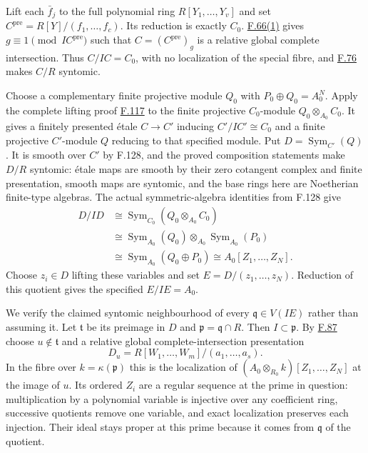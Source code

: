 \documentclass[11pt,a4paper,openany]{report}
\begin{document}
Lift each \(\bar f_j\) to the full polynomial ring \(R[Y_1,\ldots,Y_v]\) and set \(C^{\mathrm{pre}}=R[Y]/(f_1,\ldots,f_c)\). Its reduction is exactly \(C_0\). \hyperref[AG-RG-S05-algebra-lemma-localize-relative-complete-intersection]{F.66(1)} gives \(g\equiv1\pmod{IC^{\mathrm{pre}}}\) such that \(C=(C^{\mathrm{pre}})_g\) is a relative global complete intersection. Thus \(C/IC=C_0\), with no localization of the special fibre, and \hyperref[AG-RG-S05-algebra-lemma-relative-global-complete-intersection]{F.76} makes \(C/R\) syntomic.

Choose a complementary finite projective module \(Q_0\) with \(P_0\oplus Q_0=A_0^N\). Apply the complete lifting proof \hyperref[AG-RG-S05-more-algebra-lemma-lift-projective-module]{F.117} to the finite projective \(C_0\)-module \(Q_0\otimes_{A_0}C_0\). It gives a finitely presented étale \(C\to C'\) inducing \(C'/IC'\cong C_0\) and a finite projective \(C'\)-module \(Q\) reducing to that specified module. Put \(D=\operatorname{Sym}_{C'}(Q)\). It is smooth over \(C'\) by F.128, and the proved composition statements make \(D/R\) syntomic: étale maps are smooth by their zero cotangent complex and finite presentation, smooth maps are syntomic, and the base rings here are Noetherian finite-type algebras. The actual symmetric-algebra identities from F.128 give \[\begin{aligned}
D/ID&\cong\operatorname{Sym}_{C_0}(Q_0\otimes_{A_0}C_0)\\
&\cong\operatorname{Sym}_{A_0}(Q_0)\otimes_{A_0}\operatorname{Sym}_{A_0}(P_0)\\
&\cong\operatorname{Sym}_{A_0}(Q_0\oplus P_0)\cong A_0[Z_1,\ldots,Z_N].
\end{aligned}\] Choose \(z_i\in D\) lifting these variables and set \(E=D/(z_1,\ldots,z_N)\). Reduction of this quotient gives the specified \(E/IE=A_0\).

We verify the claimed syntomic neighbourhood of every \(\mathfrak q\in V(IE)\) rather than assuming it. Let \(\mathfrak t\) be its preimage in \(D\) and \(\mathfrak p=\mathfrak q\cap R\). Then \(I\subset\mathfrak p\). By \hyperref[AG-RG-S05-algebra-lemma-syntomic]{F.87} choose \(u\notin\mathfrak t\) and a relative global complete-intersection presentation \[D_u=R[W_1,\ldots,W_m]/(a_1,\ldots,a_s).\] In the fibre over \(k=\kappa(\mathfrak p)\) this is the localization of \((A_0\otimes_{R_0}k)[Z_1,\ldots,Z_N]\) at the image of \(u\). Its ordered \(Z_i\) are a regular sequence at the prime in question: multiplication by a polynomial variable is injective over any coefficient ring, successive quotients remove one variable, and exact localization preserves each injection. Their ideal stays proper at this prime because it comes from \(\mathfrak q\) of the quotient.
\end{document}
